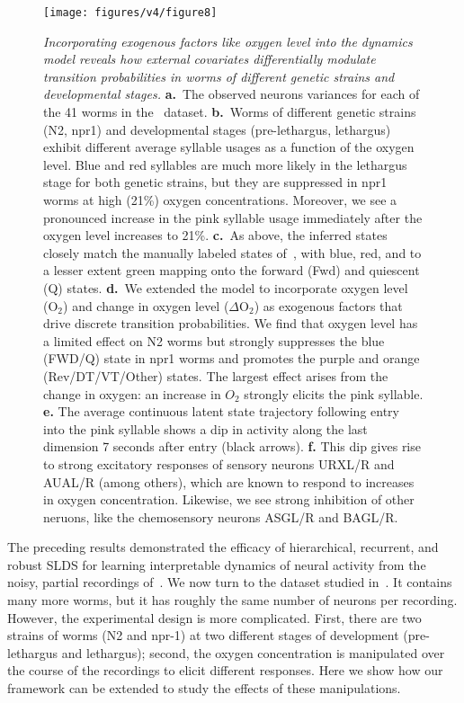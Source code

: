 \documentclass[11pt]{article}
\begin{document}
\begin{figure}[t!]
\centering
\texttt{[image: figures/v4/figure8]} 
\caption{\textit{Incorporating exogenous factors like oxygen level
    into the dynamics model reveals how external covariates
    differentially modulate transition probabilities in worms of
    different genetic strains and developmental stages.}
  \textbf{a.}~The observed neurons variances for each of the 41 worms
  in the~\citet{nichols2017global} dataset.  \textbf{b.}~Worms of
  different genetic strains (N2, npr1) and developmental stages
  (pre-lethargus, lethargus) exhibit different average syllable usages
  as a function of the oxygen level.  Blue and red syllables are much
  more likely in the lethargus stage for both genetic strains, but
  they are suppressed in npr1 worms at high (21\%) oxygen
  concentrations. Moreover, we see a pronounced increase in the pink
  syllable usage immediately after the oxygen level increases to 21\%.
  \textbf{c.}~As above, the inferred states closely match the manually
  labeled states of~\citet{nichols2017global}, with blue, red, and to
  a lesser extent green mapping onto the forward (\textsf{Fwd}) and
  quiescent (\textsf{Q}) states.  \textbf{d.}~We extended the model to
  incorporate oxygen level (O$_2$) and change in oxygen level
  ($\Delta$O$_2$) as exogenous factors that drive discrete transition
  probabilities.  We find that oxygen level has a limited effect on N2
  worms but strongly suppresses the blue (\textsf{FWD/Q}) state in
  npr1 worms and promotes the purple and orange
  (\textsf{Rev/DT/VT/Other}) states. The largest effect arises from
  the change in oxygen: an increase in $O_2$ strongly elicits the pink
  syllable.  \textbf{e.} The average continuous latent state
  trajectory following entry into the pink syllable shows a dip in
  activity along the last dimension 7 seconds after entry (black
  arrows).  \textbf{f.} This dip gives rise to strong excitatory
  responses of sensory neurons \textsf{URXL/R} and \textsf{AUAL/R}
  (among others), which are known to respond to increases in oxygen
  concentration. Likewise, we see strong inhibition of other neruons,
  like the chemosensory neurons \textsf{ASGL/R} and \textsf{BAGL/R}.}
\label{fig:o2}
\end{figure}

The preceding results demonstrated the efficacy of hierarchical,
recurrent, and robust SLDS for learning interpretable dynamics of
neural activity from the noisy, partial recordings
of~\citet{kato2015global}.  We now turn to the dataset studied
in~\citet{nichols2017global}. It contains many more worms, but it has
roughly the same number of neurons per recording.  However, the
experimental design is more complicated.  First, there are two strains
of worms (N2 and npr-1) at two different stages of development
(pre-lethargus and lethargus); second, the oxygen concentration is
manipulated over the course of the recordings to elicit different
responses.  Here we show how our framework can be extended to study
the effects of these manipulations.
\end{document}
